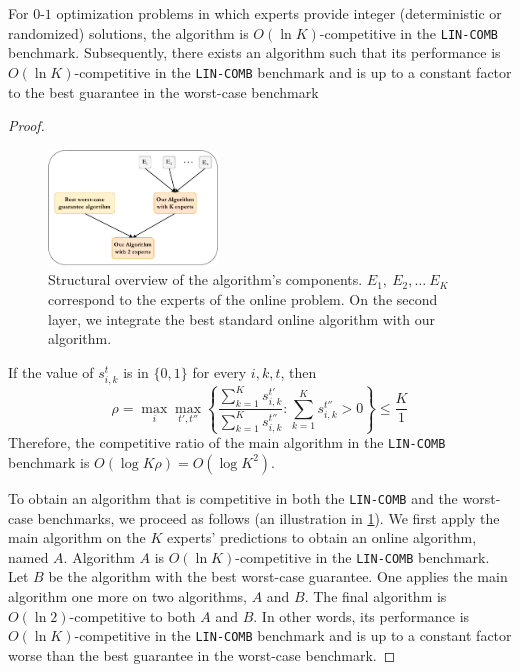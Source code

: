 \begin{corollary} \label{corollary}
	For $0$-$1$ optimization problems in which experts provide integer (deterministic or randomized) solutions,
	the algorithm is $O(\ln K)$-competitive in the \texttt{LIN-COMB} benchmark.
	Subsequently, there exists an algorithm such that its performance is $O(\ln K)$-competitive in the \texttt{LIN-COMB}
	benchmark and is up to a constant factor to the best guarantee in the worst-case benchmark
\end{corollary}
%
\begin{proof}

\begin{figure}
 \vspace{-0.9cm}
  \begin{center}
    \includegraphics[width=0.4\textwidth]{../paper/Img/algo_structure.pdf}
  \end{center}
  \vspace{-0.5cm}
      \caption{Structural overview of the algorithm's components. $E_1,\ E_2, \dots\ E_K$ correspond to the experts of the online problem.
      On the second layer, we integrate the best standard online algorithm with our algorithm. }
  \label{fig:algo-layers}
   \vspace{-0.5cm}
\end{figure}

	If the value of $s_{i,k}^{t}$ is in $\{0,1\}$ for every $i,k,t$, then
	\[
	\rho = \max_{i} \max_{t',t''} \left\{\frac{\sum_{k=1}^{K} s_{i,k}^{t'}}{\sum_{k=1}^{K} s_{i,k}^{t''}} : \sum_{k=1}^{K} s_{i,k}^{t''} > 0 \right\}
	\leq \frac{K}{1}
	\]
	Therefore, the competitive ratio of the main algorithm in the \texttt{LIN-COMB} benchmark is $O(\log K \rho) = O(\log K^2)$.

 	To obtain an algorithm that is competitive in both the \texttt{LIN-COMB} and the worst-case benchmarks, we proceed as follows (an illustration in \cref{fig:algo-layers}).
	We first apply the main algorithm on the $K$ experts' predictions to obtain an online algorithm, named $A$.
	Algorithm $A$ is $O(\ln K)$-competitive in the \texttt{LIN-COMB} benchmark. Let $B$ be the algorithm with the best worst-case guarantee.
	One applies the main algorithm one more on two algorithms, $A$ and $B$. The final algorithm is $O(\ln 2)$-competitive to both $A$ and $B$.
	In other words, its performance is $O(\ln K)$-competitive in the \texttt{LIN-COMB} benchmark and is up to a constant factor worse than the best guarantee in the worst-case benchmark.

\end{proof}

